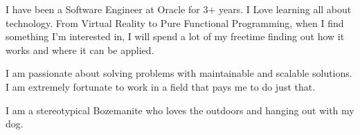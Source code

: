 

\begin{cvparagraph}

I have been a Software Engineer at Oracle for 3+ years.
I Love learning all about technology. From Virtual Reality to Pure Functional Programming, when I find something I'm interested in, I will spend a lot of my freetime finding out how it works and where it can be applied.

I am passionate about solving problems with maintainable and scalable solutions. I am extremely fortunate to work in a field that pays me to do just that.

I am a stereotypical Bozemanite who loves the outdoors and hanging out with my dog.
\end{cvparagraph}

